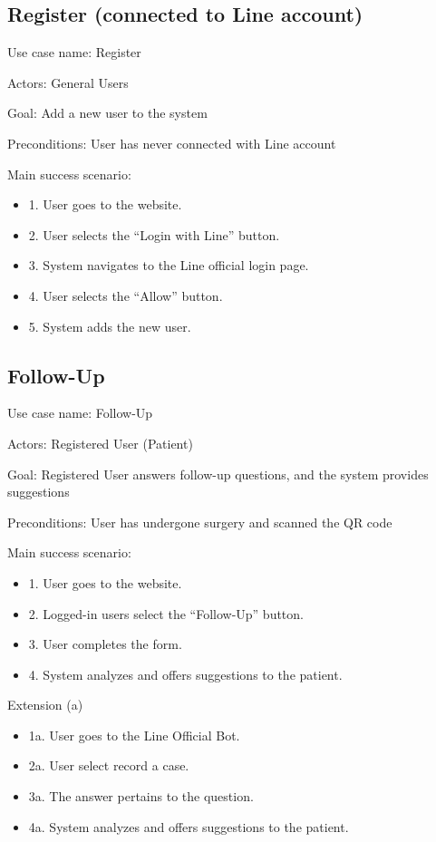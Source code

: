 \documentclass[12pt,oneside,openright,a4paper]{cpe-english-project}
\begin{document}
      \subsection{Register (connected to Line account)}
        \qquad Use case name: Register \par
        \qquad Actors: General Users \par
        \qquad Goal: Add a new user to the system \par
        \qquad Preconditions: User has never connected with Line account \par
        \qquad Main success scenario:
        \begin{itemize}
          \item[] 1. User goes to the website.
          \item[] 2. User selects the “Login with Line” button.
          \item[] 3. System navigates to the Line official login page.
          \item[] 4. User selects the “Allow” button.
          \item[] 5. System adds the new user.
        \end{itemize}
      
      \subsection{Follow-Up}
        \qquad Use case name: Follow-Up \par
        \qquad Actors: Registered User (Patient) \par
        \qquad Goal: Registered User answers follow-up questions, and the system provides suggestions \par
        \qquad Preconditions: User has undergone surgery and scanned the QR code \par
        \qquad Main success scenario:
        \begin{itemize}
          \item[] 1. User goes to the website.
          \item[] 2. Logged-in users select the “Follow-Up” button.
          \item[] 3. User completes the form.
          \item[] 4. System analyzes and offers suggestions to the patient.
        \end{itemize}
        \qquad Extension (a)
        \begin{itemize}
          \item[] 1a. User goes to the Line Official Bot.
          \item[] 2a. User select record a case.
          \item[] 3a. The answer pertains to the question.
          \item[] 4a. System analyzes and offers suggestions to the patient.
        \end{itemize}
\end{document}
